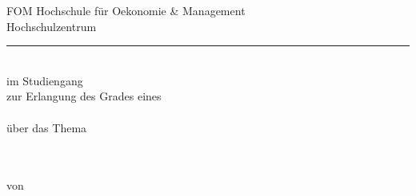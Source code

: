 
\begin{titlepage}
\thispagestyle{empty}

\noindent
\begin{minipage}[c]{0.27\textwidth}
    
\end{minipage}\hfill
\begin{minipage}[c]{0.7\textwidth}
    \raggedleft
    {\large\sffamily FOM Hochschule für Oekonomie \& Management}\\[0.15cm]
    {\large\sffamily Hochschulzentrum \arbeitHochschulzentrum}
\end{minipage}

\vspace{0.4cm}
{\color{FOMakzent}\rule{\textwidth}{0.8pt}}

\begin{center}
\vspace{1cm}

{\Large\sffamily\bfseries \arbeitArt}\\[0.25cm]
{\large\sffamily im Studiengang \arbeitStudiengang}\\[0.9cm]

zur Erlangung des Grades eines\\[0.25cm]
{\Large\sffamily\bfseries \arbeitGrad}\\[0.9cm]

über das Thema\\[0.5cm]

{\huge\sffamily\bfseries \arbeitTitel}\\[0.3cm]
\ifx\arbeitUntertitel\empty\else
    {\Large\sffamily \arbeitUntertitel}\\[0.8cm]
\fi
\vspace{0.7cm}

von\\[0.3cm]
{\LARGE\sffamily \autorVorname{} \autorNachname}\\[0.35cm]
{\LARGE\sffamily \autorZweiVorname{} \autorZweiNachname}\\[1cm]


\end{center}
\end{titlepage}
